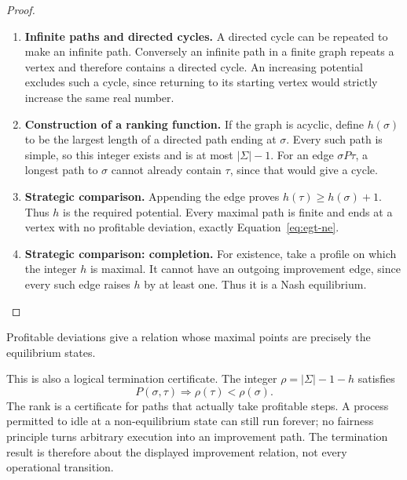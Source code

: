 \documentclass[11pt,a4paper]{article}
\numberwithin{equation}{section}
\theoremstyle{definition}
\theoremstyle{remark}
\theoremstyle{plain}
\begin{document}
\begin{proof}
\leavevmode
\begin{enumerate}[label=\textup{(\arabic*)},leftmargin=*,itemsep=4pt,topsep=3pt]
  \item \textbf{Infinite paths and directed cycles.} A directed cycle can be repeated to make an infinite path. Conversely
an infinite path in a finite graph repeats a vertex and therefore
contains a directed cycle. An increasing potential excludes such a
cycle, since returning to its starting vertex would strictly increase
the same real number.
  \item \textbf{Construction of a ranking function.} If the graph is acyclic, define $h(\sigma)$ to be the largest length
of a directed path ending at $\sigma$. Every such path is simple,
so this integer exists and is at most $|\Sigma|-1$. For an edge
$\sigma P\tau$, a longest path to $\sigma$ cannot already contain
$\tau$, since that would give a cycle.
  \item \textbf{Strategic comparison.} Appending the edge proves
$h(\tau)\geq h(\sigma)+1$. Thus $h$ is the required potential. Every maximal path is finite and ends at a vertex with no profitable
deviation, exactly Equation~\eqref{eq:egt-ne}.
  \item \textbf{Strategic comparison: completion.} For existence, take a
profile on which the integer $h$ is maximal. It cannot have an outgoing
improvement edge, since every such edge raises $h$ by at least one. Thus it is a Nash equilibrium.
\end{enumerate}
\end{proof}

\noindent Profitable deviations give a relation whose maximal points are precisely the equilibrium states.
\begin{center}
\end{center}

This is also a logical termination certificate. The integer
$\rho=|\Sigma|-1-h$ satisfies
\[
 P(\sigma,\tau)\Longrightarrow\rho(\tau)<\rho(\sigma).
\]
The rank is a certificate for paths that actually take profitable
steps. A process permitted to idle at a non-equilibrium state can still
run forever; no fairness principle turns arbitrary execution into an
improvement path. The termination result is therefore about the
displayed improvement relation, not every operational transition.
\end{document}
